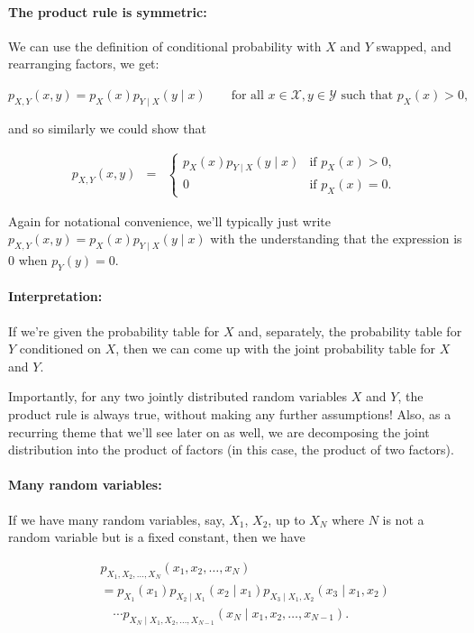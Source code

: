 \documentclass[6008notes.tex]{subfiles}
\begin{document}
\paragraph{The product rule is symmetric:} We can use the definition of conditional probability with $X$ and $Y$ swapped, and rearranging factors, we get:

$p_{X,Y}(x,y)=p_{X}(x)p_{Y\mid X}(y\mid x)\qquad \text {for all }x\in \mathcal{X},y\in \mathcal{Y}\text { such that }p_{X}(x)>0,$
 
and so similarly we could show that

\begin{eqnarray*}
p_{X,Y}(x,y)
&=&
\begin{cases}
p_{X}(x)p_{Y\mid X}(y\mid x) & \text{if }p_{X}(x)>0,\\
0 & \text{if }p_{X}(x)=0.
\end{cases}
\end{eqnarray*}

Again for notational convenience, we'll typically just write $p_{X,Y}(x,y)=p_{X}(x)p_{Y\mid X}(y\mid x)$ with the understanding that the expression is 0 when $p_{Y}(y)=0$.

\paragraph{Interpretation:} If we're given the probability table for $X$ and, separately, the probability table for $Y$ conditioned on $X$, then we can come up with the joint probability table for $X$ and $Y$.

Importantly, for any two jointly distributed random variables $X$ and $Y$, the product rule is always true, without making any further assumptions! Also, as a recurring theme that we'll see later on as well, we are decomposing the joint distribution into the product of factors (in this case, the product of two factors).

\paragraph{Many random variables:} If we have many random variables, say, $X_1$, $X_2$, up to $X_N$ where $N$ is not a random variable but is a fixed constant, then we have

\begin{eqnarray*}
&&p_{X_1, X_2, \dots ,X_N}(x_1, x_2, \dots, x_N) \\
&&=
  p_{X_1}(x_1)
  p_{X_2 \mid X_1}(x_2 \mid x_1)
  p_{X_3 \mid X_1, X_2}(x_3 \mid x_1, x_2) \\
&&\quad
  \cdots
  p_{X_N \mid X_1, X_2, \dots, X_{N-1}}(x_N \mid x_1, x_2, \dots, x_{N-1}).
\end{eqnarray*}
\end{document}
